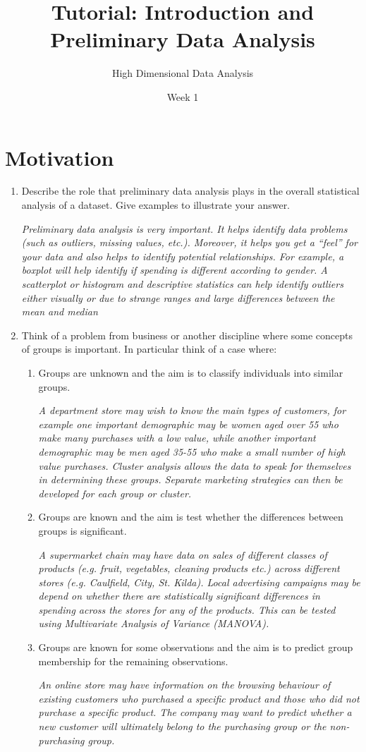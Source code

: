\documentclass{article}
\title{Tutorial:  Introduction and Preliminary Data Analysis}
\author{High Dimensional Data Analysis}
\date{Week 1}
\begin{document}
\maketitle
\section{Motivation}
\begin{enumerate}
	\item Describe the role that preliminary data analysis plays in the overall statistical analysis of a dataset. Give examples to illustrate your answer.

    {\em Preliminary data analysis is very important. It helps identify data problems (such as outliers, missing values,
	etc.). Moreover, it helps you get a “feel” for your data and also helps to identify potential relationships. For
	example, a boxplot will help identify if spending is different according to gender. A scatterplot or histogram
	and descriptive statistics can help identify outliers either visually or due to strange ranges and large differences
	between the mean and median}

	\item Think  of  a  problem  from  business  or  another  discipline  where  some  concepts  of	groups is important.   In
	particular think of a case where:
	\begin{enumerate}
		\item Groups are unknown and the aim is to classify individuals into similar groups.
        
        {\em A department store may wish to know the main types of customers, for example one important demographic may be women aged over 55 who make many purchases with a low value, while another important demographic may be men aged 35-55 who make a small number of high value purchases. Cluster analysis allows the data to speak for themselves in determining these groups. Separate marketing strategies can then be developed for each group or cluster.}
		
		\item Groups are known and the aim is test whether the differences between groups is significant.
        
        {\em A supermarket chain may have data on sales of different classes of products (e.g. fruit, vegetables, cleaning products etc.) across different stores (e.g. Caulfield, City, St. Kilda). Local advertising campaigns may be depend on whether there are statistically significant differences in spending across the stores for any of the products. This can be tested using Multivariate Analysis of Variance (MANOVA).}
		
		\item Groups are known for some observations and the aim is to predict group membership for the remaining
		observations.
		
		{\em An online store may have information on the browsing behaviour of existing customers who purchased a specific product and those who did not purchase a specific product. The company may want to predict whether a new customer will ultimately belong to the purchasing group or the non-purchasing group.}
	\end{enumerate}
\end{enumerate}
\end{document}
